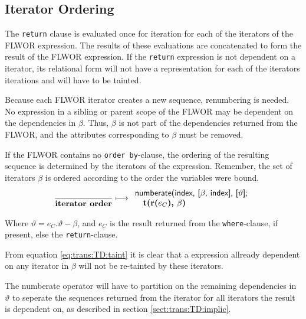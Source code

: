 \subsection{Iterator Ordering}
The \texttt{return} clause is evaluated once for iteration for each of the iterators of the FLWOR expression. The
results of these evaluations are concatenated to form the result of the FLWOR expression. If the \texttt{return}
expression is not dependent on a iterator, its relational form will not have a representation for each
of the iterators iterations and will have to be tainted.

Because each FLWOR iterator creates a new sequence, renumbering is needed. No expression in a sibling or parent
scope of the FLWOR may be dependent on the dependencies in $\beta$. Thus, $\beta$ is not part of the dependencies
returned from the FLWOR, and the attributes corresponding to $\beta$ must be removed. 

If the FLWOR contains no \texttt{order by}-clause, the ordering of the resulting sequence is determined by the
iterators of the expression. Remember, the set of iterators $\beta$ is ordered according to the order the
variables were bound.
\begin{equation}
\frac{}{\mbox{\textbf{iterator order}}}
\longmapsto
\begin{array}{l}
\mbox{\textsf{numberate(index, [}}\beta\mbox{\textsf{, index], [}}\vartheta\mbox{\textsf{];}} \\ \quad
\mbox{\textbf{t(r(}}e_{C}\mbox{\textbf{), }}\beta\mbox{\textbf{)}}
\end{array}
\label{rule:trans:TD:itOrd}
\end{equation}

Where $\vartheta = e_{C}.\vartheta - \beta$, and $e_C$ is the result returned from the \texttt{where}-clause, if
present, else the \texttt{return}-clause.

From equation \ref{eq:trans:TD:taint} it is clear that a expression allready dependent on any iterator in
$\beta$ will not be re-tainted by these iterators.

The \textsf{numberate} operator will have to partition on the remaining dependencies in $\vartheta$ to seperate
the sequences returned from the iterator for all iterators the result is dependent on, as described in section
\ref{sect:trans:TD:implic}.

